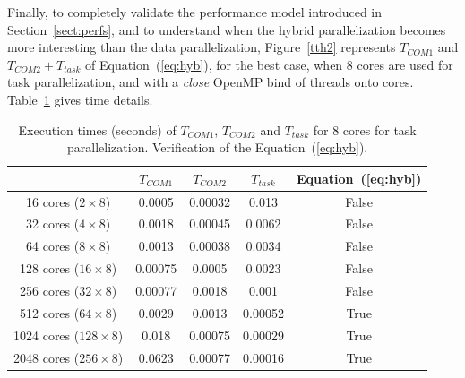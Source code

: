 Finally, to completely validate the performance model introduced in Section~\ref{sect:perfs}, and to understand when the hybrid parallelization becomes more interesting than the data parallelization, Figure~\ref{tth2} represents $T_{COM1}$ and $T_{COM2}+T_{task}$ of Equation~(\ref{eq:hyb}), for the best case, \ie when 8 cores are used for task parallelization, and with a \emph{close} OpenMP bind of threads onto cores. Table~\ref{fig:tth} gives time details.

\begin{table}[!h]
 \begin{center}
 \begin{tabular}{|c|c|c|c|c|}
    \hline 
    & $T_{COM1}$ & $T_{COM2}$ & $T_{task}$ & Equation~(\ref{eq:hyb})\\
   \hline
   16 cores ($2 \times 8$) & 0.0005 & 0.00032 & 0.013 & False\\
   32 cores ($4 \times 8$) & 0.0018 & 0.00045 & 0.0062 & False\\
   64 cores ($8 \times 8$) & 0.0013 & 0.00038 & 0.0034 & False\\
   128 cores ($16 \times 8$) & 0.00075 & 0.0005 & 0.0023 & False\\
   256 cores ($32 \times 8$) & 0.00077 & 0.0018 & 0.001 & False\\
   512 cores ($64 \times 8$) & 0.0029 & 0.0013 & 0.00052 & True\\
   1024 cores ($128 \times 8$) & 0.018 & 0.00075 & 0.00029 & True\\
   2048 cores ($256 \times 8$) & 0.0623 & 0.00077 & 0.00016 & True\\
   \hline
 \end{tabular}
\caption{Execution times (seconds) of $T_{COM1}$, $T_{COM2}$ and $T_{task}$ for 8 cores for task parallelization. Verification of the Equation~(\ref{eq:hyb}).}
\label{fig:tth}
 \end{center}
\end{table}

